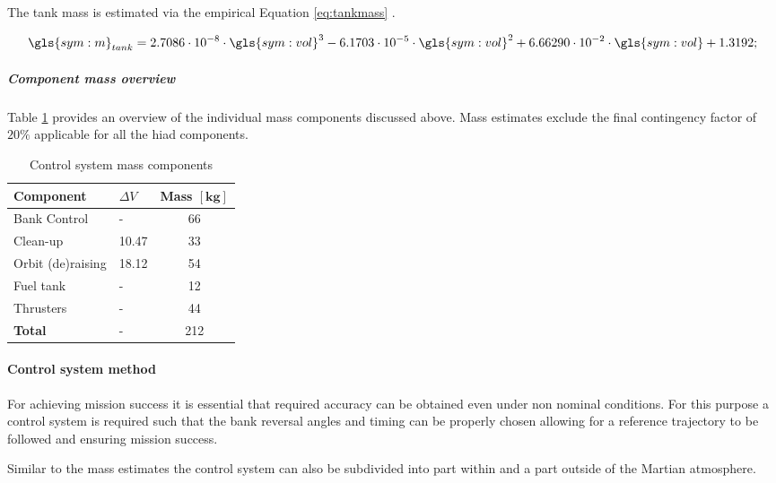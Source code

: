 The tank mass is estimated via the empirical Equation \ref{eq:tankmass} \cite[p.543]{Wertz2011}.

\begin{equation}
\label{eq:tankmass} 
\gls{sym:m}_{tank}=2.7086 \cdot 10^{-8} \cdot \gls{sym:vol}^3 -6.1703 \cdot 10^{-5} \cdot \gls{sym:vol}^2 +6.66290 \cdot 10^{-2}  \cdot \gls{sym:vol} +1.3192;
\end{equation}

\subparagraph{Component mass overview}

Table \ref{tab:controlmassbreakdown} provides an overview of the individual mass components discussed above. Mass estimates exclude the final contingency factor of $20\%$ applicable for all the \gls{hiad} components.

\begin{table}[h]
\centering
\caption{Control system mass components}
\label{tab:controlmassbreakdown}
\begin{tabular}{|l|l|c|} \hline
\textbf{Component}           &\textbf{$\Delta V$}  & \textbf{Mass $\mathbf{[kg]}$} \\ \hline \hline
Bank Control    &  - &			 66       \\ \hline
Clean-up         & 10.47  &		  33       \\ \hline
Orbit (de)raising& 18.12  &		  54       \\ \hline
Fuel tank              		 & -  &  12      \\ \hline
Thrusters                	 & -  &  44     \\ \hline \hline
\textbf{Total}               & -  &  212      \\ \hline
\end{tabular}
\end{table}

\paragraph{Control system method}

For achieving mission success it is essential that required accuracy can be obtained even under non nominal conditions. For this purpose a control system is required such that the bank reversal angles and timing can be properly chosen allowing for a reference trajectory to be followed and ensuring mission success.

Similar to the mass estimates the control system can  also be subdivided into part within and a part outside of the Martian atmosphere.

